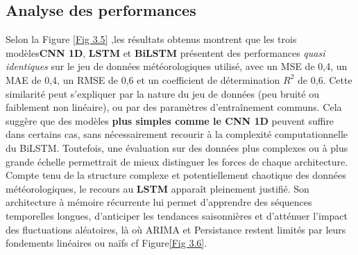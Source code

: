 \documentclass[a4paper,12pt,openany]{report}
\begin{document}
	\subsection{Analyse des performances}
	
	Selon la Figure \ref{Fig 3.5} ,les résultats obtenus montrent que les trois modèles\textbf{CNN 1D}, \textbf{LSTM} et \textbf{BiLSTM} présentent des performances \emph{quasi identiques} sur le jeu de données météorologiques utilisé, avec un MSE de 0{,}4, un MAE de 0{,}4, un RMSE de 0{,}6 et un coefficient de détermination \( R^2 \) de 0{,}6. Cette similarité peut s’expliquer par la nature du jeu de données (peu bruité ou faiblement non linéaire), ou par des paramètres d'entraînement communs. Cela suggère que des modèles \textbf{plus simples comme le CNN 1D} peuvent suffire dans certains cas, sans nécessairement recourir à la complexité computationnelle du BiLSTM. Toutefois, une évaluation sur des données plus complexes ou à plus grande échelle permettrait de mieux distinguer les forces de chaque architecture.\\
	Compte tenu de la structure complexe et potentiellement chaotique des données météorologiques, le recours au \textbf{LSTM} apparaît pleinement justifié. Son architecture à mémoire récurrente lui permet d’apprendre des séquences temporelles longues, d’anticiper les tendances saisonnières et d’atténuer l’impact des fluctuations aléatoires, là où ARIMA et Persistance restent limités par leurs fondements linéaires ou naïfs cf Figure\ref{Fig 3.6}.
	
\end{document}
